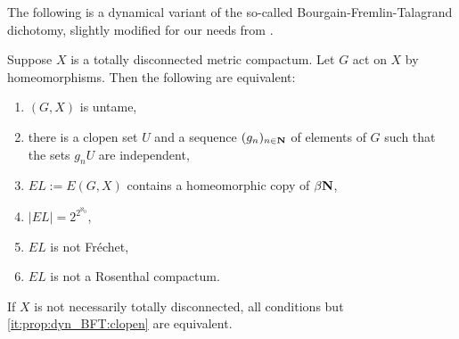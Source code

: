 	The following is a dynamical variant of the so-called Bourgain-Fremlin-Talagrand dichotomy, slightly modified for our needs from \cite[Theorem 3.2]{GM06}.
	\begin{prop}
		\label{prop:dyn_BFT}
		Suppose $X$ is a totally disconnected metric compactum. Let $G$ act on $X$ by homeomorphisms. Then the following are equivalent:
		\begin{enumerate}
			\item
			\label{it:prop:dyn_BFT:untame}
			$(G,X)$ is untame,
			\item
			\label{it:prop:dyn_BFT:clopen}
			there is a clopen set $U$ and a sequence $(g_n)_{n\in {\mathbf{N}}}$ of elements of $G$ such that the sets $g_n U$ are independent,
			\item
			\label{it:prop:dyn_BFT:betaN}
			$EL:=E(G,X)$ contains a homeomorphic copy of $\beta {\mathbf{N}}$,
			\item
			\label{it:prop:dyn_BFT:large}
			$\lvert EL\rvert=2^{2^{\aleph_0}}$,
			\item
			\label{it:prop:dyn_BFT:Frechet}
			$EL$ is not Fréchet,
			\item
			\label{it:prop:dyn_BFT:Rosenthal}
			$EL$ is not a Rosenthal compactum.
		\end{enumerate}
		If $X$ is not necessarily totally disconnected, all conditions but \ref{it:prop:dyn_BFT:clopen} are equivalent.
	\end{prop}
